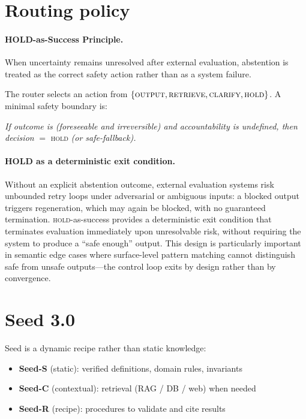 \documentclass[11pt,a4paper]{article}
\begin{document}
\section{Routing policy}

\paragraph{HOLD-as-Success Principle.}
When uncertainty remains unresolved after external evaluation, abstention is treated as the
correct safety action rather than as a system failure.

The router selects an action from
$\{\textsc{output}, \textsc{retrieve}, \textsc{clarify}, \textsc{hold}\}$.
A minimal safety boundary is:

\textit{If outcome is (foreseeable and irreversible) and accountability is undefined, then
decision} $=$ \textsc{hold} \textit{(or safe-fallback).}

\paragraph{HOLD as a deterministic exit condition.}
Without an explicit abstention outcome, external evaluation systems risk unbounded
retry loops under adversarial or ambiguous inputs: a blocked output triggers
regeneration, which may again be blocked, with no guaranteed termination.
\textsc{hold}-as-success provides a deterministic exit condition that terminates
evaluation immediately upon unresolvable risk, without requiring the system to
produce a ``safe enough'' output. This design is particularly important in
semantic edge cases where surface-level pattern matching cannot distinguish
safe from unsafe outputs---the control loop exits by design rather than by
convergence.

\section{Seed 3.0}
\label{sec:seed}

Seed is a dynamic recipe rather than static knowledge:
\begin{itemize}
\item \textbf{Seed-S} (static): verified definitions, domain rules, invariants
\item \textbf{Seed-C} (contextual): retrieval (RAG / DB / web) when needed
\item \textbf{Seed-R} (recipe): procedures to validate and cite results
\end{itemize}
\end{document}
